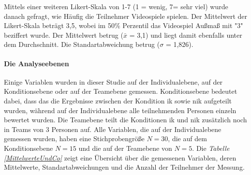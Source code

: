 \documentclass[a4paper,11pt]{article}%
\renewcommand{\\}{\vspace*{0.5\baselineskip} \newline}
\begin{document}
Mittels einer weiteren Likert-Skala von 1-7 (1 = wenig, 7= sehr viel) wurde danach gefragt, wie Häufig die Teilnehmer Videospiele spielen. Der Mittelwert der Likert-Skala beträgt 3,5, wobei im 50\% Perzentil das Videospiel Außmaß mit "3" beziffert wurde. Der Mittelwert betrug ($\bar{x}$ = 3,1) und liegt damit ebenfalls unter dem Durchschnitt. Die Standartabweichung betrug ($\sigma$ = 1,826).
\paragraph{Die Analyseebenen}
Einige Variablen wurden in dieser Studie auf der Individualebene, auf der Konditionsebene oder auf der Teamebene gemessen.
Konditionsebene bedeutet dabei, dass das die Ergebnisse zwischen der Kondition \ac{ik} sowie \ac{nik} aufgeteilt wurden, während auf der Individualebene alle teilnehmenden Personen einzeln bewertet wurden. Die Teamebene teilt die Konditionen \ac{ik} und \ac{nik} zusätzlich noch in Teams von 3 Personen auf.  Alle Variablen, die auf der Individualebene gemessen wurden, haben eine Stichprobengröße $N = 30$, die auf dem Konditionsebene $ N = 15$ und die auf der Teamebene von $N = 5$.
Die \textit{Tabelle \ref{MittelwerteUndCo}} zeigt eine Übersicht über die gemessenen Variablen, deren Mittelwerte, Standartabweichungen und die Anzahl der Teilnehmer der Messung.

\newpage
\end{document}
